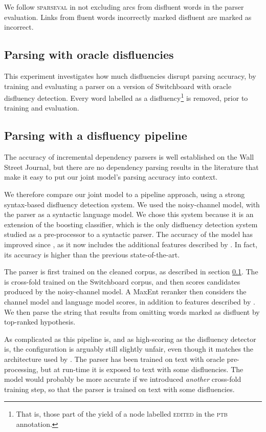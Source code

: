 \documentclass[11pt,letterpaper]{article}
\newcommand{\sparseval}{\textsc{sparseval}\xspace}
\begin{document}
We follow \sparseval in not excluding arcs from disfluent words in the parser
evaluation.  Links from fluent words incorrectly marked disfluent are marked as
incorrect.

\subsection{Parsing with oracle disfluencies}
\label{sec:oracle}
This experiment investigates how much disfluencies disrupt parsing accuracy,
by training and evaluating a parser on a version of Switchboard with oracle
disfluency detection.  Every word labelled as a disfluency\footnote{That is, those
part of the yield of a node labelled \textsc{edited} in the \textsc{ptb} annotation.}
is removed, prior to training and evaluation.

\subsection{Parsing with a disfluency pipeline}
\label{sec:pipeline}
The accuracy of incremental dependency parsers is well established on the Wall
Street Journal, but there are no dependency parsing results in the literature
that make it easy to put our joint model's parsing accuracy into context.

We therefore compare our joint model to a pipeline approach, using a strong 
syntax-based disfluency detection system.  We used the \citet{Johnson04a}
noisy-channel model, with the \citet{Charniak01a} parser as a syntactic language
model.  We chose this system because it is an extension of the \citet{Charniak01b}
boosting classifier, which is the only disfluency detection system studied as
a pre-processor to a syntactic parser.  The accuracy of the model has improved
since \citet{Johnson04a}, as it now includes the additional features described by
\citet{zwarts:11}.  In fact, its accuracy is higher than the previous state-of-the-art.

The parser is first trained on the cleaned corpus, as described in section
\ref{sec:oracle}. The \citet{Charniak01a} is cross-fold trained on the Switchboard
corpus, and then scores candidates produced by the \citet{Johnson04a} noisy-channel
model.  A MaxEnt reranker then considers the channel model and language model scores,
in addition to features described by \citet{zwarts:11}. We then parse the string
that results from omitting words marked as disfluent by top-ranked hypothesis.

As complicated as this pipeline is, and as high-scoring as the disfluency detector
is, the configuration is arguably still slightly unfair, even though it matches
the architecture used by \citet{Charniak01a}. The parser has been
trained on text with oracle pre-processing, but at run-time it is exposed to
text with some disfluencies. The model would probably be more accurate if we
introduced \emph{another} cross-fold training step, so that the parser is trained
on text with some disfluencies.
\end{document}
